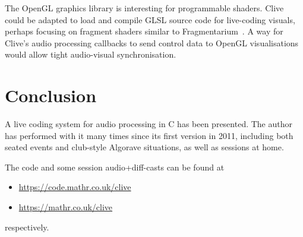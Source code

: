 \documentclass[11pt,a4paper]{article}
\begin{document}
The OpenGL graphics library is interesting for programmable shaders.  Clive
could be adapted to load and compile GLSL source code for live-coding visuals,
perhaps focusing on fragment shaders similar to Fragmentarium~\cite{FRAG}.
A way for Clive's audio processing callbacks to send control data to OpenGL
visualisations would allow tight audio-visual synchronisation.


\section{Conclusion}\label{conclusion}

A live coding system for audio processing in C has been presented. The
author has performed with it many times since its first version in 2011,
including both seated events and club-style Algorave situations, as well
as sessions at home.

The code and some session audio+diff-casts can be found at
\begin{itemize}
\item \url{https://code.mathr.co.uk/clive}
\item \url{https://mathr.co.uk/clive}
\end{itemize}
respectively.



\end{document}
